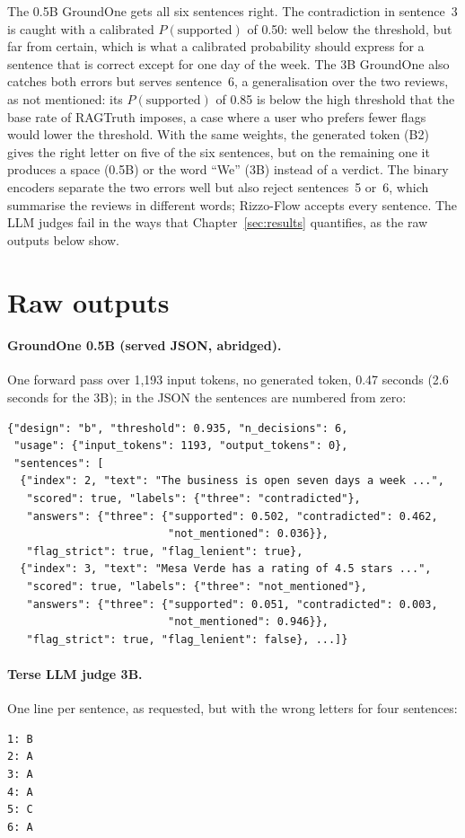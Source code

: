 The 0.5B GroundOne gets all six sentences right. The contradiction in sentence~3 is caught with a calibrated
$P(\text{supported})$ of 0.50: well below the threshold, but far from certain, which is what a calibrated probability
should express for a sentence that is correct except for one day of the week. The 3B GroundOne also catches both errors
but serves sentence~6, a generalisation over the two reviews, as not mentioned: its $P(\text{supported})$ of 0.85 is
below the high threshold that the base rate of RAGTruth imposes, a case where a user who prefers fewer flags would lower
the threshold. With the same weights, the generated token (B2) gives the right letter on five of the six sentences, but
on the remaining one it produces a space (0.5B) or the word ``We'' (3B) instead of a verdict. The binary encoders separate the two errors
well but also reject sentences~5 or~6, which summarise the reviews in different words; Rizzo-Flow accepts every
sentence. The LLM judges fail in the ways that Chapter~\ref{sec:results} quantifies, as the raw outputs below
show.

\section{Raw outputs}

\paragraph{GroundOne 0.5B (served JSON, abridged).} One forward pass over 1{,}193 input tokens, no generated token,
0.47 seconds (2.6 seconds for the 3B); in the JSON the sentences are numbered from zero:
{\footnotesize
\begin{verbatim}
{"design": "b", "threshold": 0.935, "n_decisions": 6,
 "usage": {"input_tokens": 1193, "output_tokens": 0},
 "sentences": [
  {"index": 2, "text": "The business is open seven days a week ...",
   "scored": true, "labels": {"three": "contradicted"},
   "answers": {"three": {"supported": 0.502, "contradicted": 0.462,
                         "not_mentioned": 0.036}},
   "flag_strict": true, "flag_lenient": true},
  {"index": 3, "text": "Mesa Verde has a rating of 4.5 stars ...",
   "scored": true, "labels": {"three": "not_mentioned"},
   "answers": {"three": {"supported": 0.051, "contradicted": 0.003,
                         "not_mentioned": 0.946}},
   "flag_strict": true, "flag_lenient": false}, ...]}
\end{verbatim}
}

\paragraph{Terse LLM judge 3B.} One line per sentence, as requested, but with the wrong letters for four sentences:
{\footnotesize
\begin{verbatim}
1: B
2: A
3: A
4: A
5: C
6: A
\end{verbatim}
}

